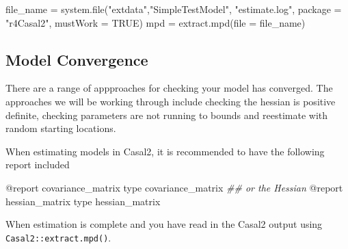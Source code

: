 \documentclass[
]{book}
\newenvironment{Shaded}{\begin{snugshade}}{\end{snugshade}}
\newcommand{\AttributeTok}[1]{\textcolor[rgb]{0.77,0.63,0.00}{#1}}
\newcommand{\BuiltInTok}[1]{#1}
\newcommand{\CommentTok}[1]{\textcolor[rgb]{0.56,0.35,0.01}{\textit{#1}}}
\newcommand{\ConstantTok}[1]{\textcolor[rgb]{0.00,0.00,0.00}{#1}}
\newcommand{\ExtensionTok}[1]{#1}
\newcommand{\FunctionTok}[1]{\textcolor[rgb]{0.00,0.00,0.00}{#1}}
\newcommand{\NormalTok}[1]{#1}
\newcommand{\OtherTok}[1]{\textcolor[rgb]{0.56,0.35,0.01}{#1}}
\newcommand{\StringTok}[1]{\textcolor[rgb]{0.31,0.60,0.02}{#1}}
\begin{document}
\begin{Shaded}
\begin{Highlighting}[]
\NormalTok{file\_name }\OtherTok{=} \FunctionTok{system.file}\NormalTok{(}\StringTok{"extdata"}\NormalTok{,}\StringTok{"SimpleTestModel"}\NormalTok{, }
                        \StringTok{"estimate.log"}\NormalTok{, }\AttributeTok{package =} \StringTok{"r4Casal2"}\NormalTok{, }\AttributeTok{mustWork =} \ConstantTok{TRUE}\NormalTok{)}
\NormalTok{mpd }\OtherTok{=} \FunctionTok{extract.mpd}\NormalTok{(}\AttributeTok{file =}\NormalTok{ file\_name)}
\end{Highlighting}
\end{Shaded}

\hypertarget{model-convergence}{%
\subsection{Model Convergence}\label{model-convergence}}

There are a range of appproaches for checking your model has converged. The approaches we will be working through include checking the hessian is positive definite, checking parameters are not running to bounds and reestimate with random starting locations.

When estimating models in Casal2, it is recommended to have the following report included

\begin{Shaded}
\begin{Highlighting}[]
\ExtensionTok{@report}\NormalTok{ covariance\_matrix}
\BuiltInTok{type}\NormalTok{ covariance\_matrix}
\CommentTok{\#\# or the Hessian}
\ExtensionTok{@report}\NormalTok{ hessian\_matrix}
\BuiltInTok{type}\NormalTok{ hessian\_matrix}
\end{Highlighting}
\end{Shaded}

When estimation is complete and you have read in the Casal2 output using \texttt{Casal2::extract.mpd()}.
\end{document}
